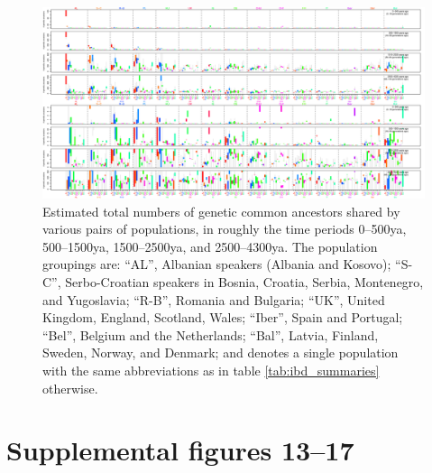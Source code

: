 \documentclass{article}
\begin{document}
\begin{figure}[!htp]
  \begin{center}
    
    \vspace{2em}
    \begin{center}
      \includegraphics[angle=90,height=.9\textheight]{inversion-boxplots-long}
    \end{center}
    \vspace{2em}
    \caption{
    Estimated total numbers of genetic common ancestors shared by various pairs of populations,
    in roughly the time periods 0--500ya, 500--1500ya, 1500--2500ya, and 2500--4300ya.
    The population groupings are:
    ``AL'', Albanian speakers (Albania and Kosovo);
    ``S-C'', Serbo-Croatian speakers in Bosnia, Croatia, Serbia, Montenegro, and Yugoslavia;
    ``R-B'', Romania and Bulgaria;
    ``UK'', United Kingdom, England, Scotland, Wales;
    ``Iber'', Spain and Portugal;
    ``Bel'', Belgium and the Netherlands;
    ``Bal'', Latvia, Finland, Sweden, Norway, and Denmark;
    and denotes a single population with the same abbreviations as in table \ref{tab:ibd_summaries} otherwise.
    \label{sfig:inversion_boxplots_long}
    }
  \end{center}
\end{figure}

\section*{Supplemental figures 13--17}
\end{document}
